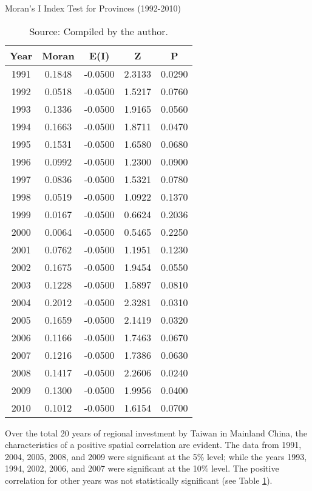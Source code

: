 \documentclass{article}
\begin{document}
\begin{table}[H]
\centering
\caption{Moran's I Index Test for Provinces (1992-2010)}
\begin{tabular}{ccccc}
\toprule
\textbf{Year} & \textbf{Moran} & \textbf{E(I)} & \textbf{Z} & \textbf{P} \\
\midrule
1991 & 0.1848 & -0.0500 & 2.3133 & 0.0290 \\
1992 & 0.0518 & -0.0500 & 1.5217 & 0.0760 \\
1993 & 0.1336 & -0.0500 & 1.9165 & 0.0560 \\
1994 & 0.1663 & -0.0500 & 1.8711 & 0.0470 \\
1995 & 0.1531 & -0.0500 & 1.6580 & 0.0680 \\
1996 & 0.0992 & -0.0500 & 1.2300 & 0.0900 \\
1997 & 0.0836 & -0.0500 & 1.5321 & 0.0780 \\
1998 & 0.0519 & -0.0500 & 1.0922 & 0.1370 \\
1999 & 0.0167 & -0.0500 & 0.6624 & 0.2036 \\
2000 & 0.0064 & -0.0500 & 0.5465 & 0.2250 \\
2001 & 0.0762 & -0.0500 & 1.1951 & 0.1230 \\
2002 & 0.1675 & -0.0500 & 1.9454 & 0.0550 \\
2003 & 0.1228 & -0.0500 & 1.5897 & 0.0810 \\
2004 & 0.2012 & -0.0500 & 2.3281 & 0.0310 \\
2005 & 0.1659 & -0.0500 & 2.1419 & 0.0320 \\
2006 & 0.1166 & -0.0500 & 1.7463 & 0.0670 \\
2007 & 0.1216 & -0.0500 & 1.7386 & 0.0630 \\
2008 & 0.1417 & -0.0500 & 2.2606 & 0.0240 \\
2009 & 0.1300 & -0.0500 & 1.9956 & 0.0400 \\
2010 & 0.1012 & -0.0500 & 1.6154 & 0.0700 \\
\bottomrule
\end{tabular}
\caption*{Source: Compiled by the author.}
\label{tab:morans}
\end{table}

Over the total 20 years of regional investment by Taiwan in Mainland China, the
characteristics of a positive spatial correlation are evident. The data from 1991, 2004,
2005, 2008, and 2009 were significant at the 5\% level; while the years 1993, 1994, 2002,
2006, and 2007 were significant at the 10\% level. The positive correlation for other years
was not statistically significant (see Table \ref{tab:morans}).
\end{document}
